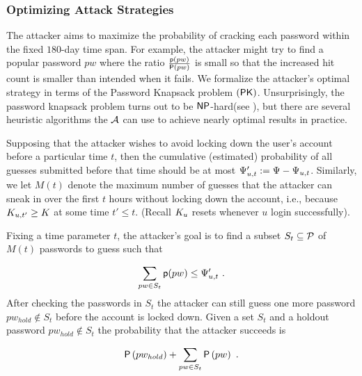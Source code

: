 \subsubsection{Optimizing Attack Strategies} %
The attacker aims to maximize the probability of cracking each password within the fixed $180$-day time span. For example, the attacker might try to find a popular password $pw$ where the ratio $\frac{\textsf{p}(pw)}{\mathsf{P}\left(pw\right)}$ is small so that the increased hit count is smaller than intended when it fails. We formalize the attacker's optimal strategy in terms of the \textsf{Password Knapsack} problem $(\mathsf{PK})$. Unsurprisingly, the password knapsack problem turns out to be $\mathsf{NP}$-hard(see ), but there are several heuristic algorithms the $\mathcal{A}$ can use to achieve nearly optimal results in practice. 





Supposing that the attacker wishes to avoid locking down the user's account before a particular time $t$, then the cumulative (estimated) probability of all guesses submitted before that time should be at most $\Psi_{u,t}':=\Psi- \Psi_{u,t}$. Similarly, we let $M(t)$ denote the maximum number of guesses that the attacker can sneak in over the first $t$ hours without locking down the account, i.e., because $K_{u,t'}  \geq K$ at some time $t' \leq t$. (Recall $K_u$ resets whenever $u$ login successfully). 



Fixing a time parameter $t$, the attacker’s goal is to find a subset $S_t \subseteq \mathcal{P}$ of $M(t)$ passwords to guess such that 



\begin{equation} \label{eq:attackerConstraint}
\vspace{-0.2cm} 
\sum_{pw \in S_t} \EstP{pw} \leq \hitCountThresholdOfU{u,t}' \ . \vspace{-0.2cm} 
\end{equation}
After checking the passwords in $S_t$ the attacker can still guess one more password $pw_{hold} \not\in S_t$ before the account is locked down. Given a set $S_t$ and a holdout password $pw_{hold} \not\in S_t$ the probability that the attacker succeeds is 

\begin{equation}\vspace{-0.1cm} \label{eq:attackerSuccess} \TrueP{pw_{hold}} + \sum_{pw \in S_t}\TrueP{pw} \ . \vspace{-0.1cm} \end{equation}

